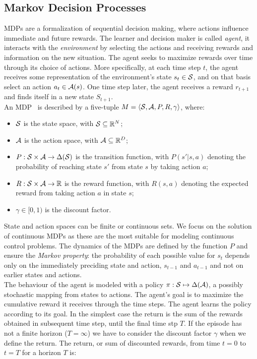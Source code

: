 \subsection{Markov Decision Processes}\label{subsec:mdp}
\ac{MDP}s are a formalization of sequential decision making, where actions influence immediate and future rewards. The learner and decision maker is called \emph{agent}, it interacts with the \emph{environment} by selecting the actions and receiving rewards and information on the new situation. The agent seeks to maximize rewards over time through its choice of actions. More specifically, at each time step $t$, the agent receives some representation of the environment's state $s_t \in \mathcal{S}$, and on that basis select an action $a_t \in \mathcal{A}(s)$. One time step later, the agent receives a reward $r_{t+1}$ and finds itself in a new state $S_{t+1}$.\\
\newline
An \ac{MDP}~\citep[]{puterman2014markov} is described by a five-tuple $M=\langle \mathcal{S}, \mathcal{A}, P, R, \gamma \rangle$, where:
\begin{itemize}
	\item $\mathcal{S}$ is the state space, with $\mathcal{S}\subseteq\mathbb{R}^N$;
	\item $\mathcal{A}$ is the action space, with $\mathcal{A}\subseteq\mathbb{R}^D$;
	\item $P: \mathcal{S} \times \mathcal{A} \to \Delta(\mathcal{S})$ is the transition function, with $P(s'|s,a)$ denoting the probability of reaching state $s'$ from state $s$ by taking action $a$;
	\item $R: \mathcal{S} \times \mathcal{A} \to \mathbb{R}$ is the reward function, with $R(s,a)$ denoting the expected reward from taking action $a$ in state $s$;
	\item $\gamma \in [0, 1)$ is the discount factor.
\end{itemize}
State and action spaces can be finite or continuous sets. We focus on the solution of continuous \ac{MDP}s as these are the most suitable for modeling continuous control problems.
The dynamics of the \ac{MDP}s are defined by the function $P$ and ensure the \emph{Markov property}: the probability of each possible value for $s_t$ depends only on the immediately preciding state and action, $s_{t-1}$ and $a_{t-1}$ and not on earlier states and actions.\\
\newline
The behaviour of the agent is modeled with a policy $\pi: \mathcal{S} \mapsto \Delta(\mathcal{A})$, \ie a possibly stochastic mapping from states to actions. The agent's goal is to maximize the cumulative reward it receives through the time steps. The agent learns the policy according to its goal. In the simplest case the return is the sum of the rewards obtained in subsequent time step, until the final time stp $T$. If the episode has not a finite horizon (\ie $T = \infty$) we have to consider the discount factor $\gamma$ when we define the return. The return, or sum of discounted rewards, from time $t=0$ to $t=T$ for a horizon $T$ is:
